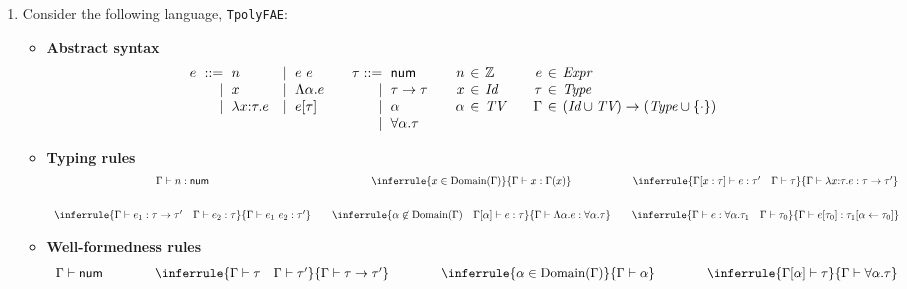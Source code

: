 \begin{enumerate}
\item Consider the following language, \texttt{TpolyFAE}:
\begin{itemize}
  \item[]\textbf{Abstract syntax}
\[
\begin{array}{r@{\hskip6pt}r@{\hskip6pt}l
  r@{\hskip6pt}l@{\hskip20pt}
  r@{\hskip6pt}l@{\hskip20pt}
  r@{\hskip4pt}c@{\hskip4pt}l@{\hskip20pt}
  r@{\hskip4pt}c@{\hskip4pt}l}
  e &::= & n &|& e\ e & \tau::= & \textsf{num} & n &\in& \mathbb{Z}& e &\in& \textit{Expr} \\
  &|& x &|& \Lambda\alpha.e &|&\tau\rightarrow\tau & x &\in& \textit{Id}& \tau &\in& \textit{Type} \\
  &|& \lambda x{:}\tau.e &|& e[\tau] &|&\alpha & \alpha &\in& \textit{TV}&
  \Gamma &\in& (\textit{Id}\cup\textit{TV})\rightarrow(\textit{Type}\cup\{\cdot\}) \\
  &&&&&|&\forall\alpha.\tau \\
\end{array}
\]
  \item[]\textbf{Typing rules}
\[
\begin{array}{c@{\hskip20pt}c@{\hskip20pt}c}
\Gamma\vdash n:\textsf{num}
  &
  \inferrule
  { x\in\Dom{\Gamma} }
  { \Gamma\vdash x:\Gamma(x) }
  &
  \inferrule
  { \Gamma[x:\tau]\vdash e:\tau' \rulesep \Gamma\vdash\tau }
  { \Gamma\vdash \lambda x{:}\tau.e:\tau\rightarrow\tau' }
  \\[20pt]
  \inferrule
  { \Gamma\vdash e_1:\tau\rightarrow\tau' \rulesep
    \Gamma\vdash e_2:\tau }
  { \Gamma\vdash e_1\ e_2:\tau' }
  &
  \inferrule
  {
    \alpha\not\in\Dom{\Gamma} \rulesep
    \Gamma[\alpha]\vdash e:\tau
  }
  { \Gamma\vdash \Lambda\alpha.e:\forall\alpha.\tau }
  &
  \inferrule
  {
    \Gamma\vdash e:\forall\alpha.\tau_1 \rulesep
    \Gamma\vdash\tau_0
  }
  { \Gamma\vdash e[\tau_0]:\tau_1[\alpha\leftarrow\tau_0] }
\end{array}
\]
  \item[]\textbf{Well-formedness rules}
\[
\begin{array}{c@{\hskip40pt}c@{\hskip40pt}c@{\hskip40pt}c}
  \Gamma\vdash\textsf{num}
  &
  \inferrule
  { \Gamma\vdash\tau \rulesep \Gamma\vdash\tau' }
  { \Gamma\vdash\tau\rightarrow\tau' }
  &
  \inferrule
  { \alpha\in\Dom{\Gamma} }
  { \Gamma\vdash\alpha }
  &
  \inferrule
  { \Gamma[\alpha]\vdash\tau }
  { \Gamma\vdash\forall\alpha.\tau }
\end{array}
\]
\end{itemize}


\end{enumerate}
